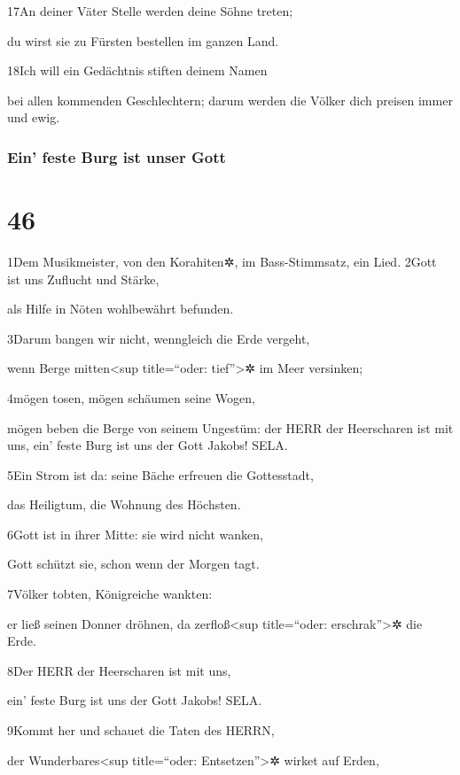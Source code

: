 17An deiner Väter Stelle werden deine Söhne treten;

du wirst sie zu Fürsten bestellen im ganzen Land.

18Ich will ein Gedächtnis stiften deinem Namen

bei allen kommenden Geschlechtern; darum werden die Völker dich preisen
immer und ewig.

\hypertarget{ein-feste-burg-ist-unser-gott}{%
\subsubsection{Ein' feste Burg ist unser
Gott}\label{ein-feste-burg-ist-unser-gott}}

\hypertarget{section-45}{%
\section{46}\label{section-45}}

1Dem Musikmeister, von den Korahiten✲, im Bass-Stimmsatz, ein Lied.
2Gott ist uns Zuflucht und Stärke,

als Hilfe in Nöten wohlbewährt befunden.

3Darum bangen wir nicht, wenngleich die Erde vergeht,

wenn Berge mitten\textless sup title=``oder: tief''\textgreater✲ im Meer
versinken;

4mögen tosen, mögen schäumen seine Wogen,

mögen beben die Berge von seinem Ungestüm: der HERR der Heerscharen ist
mit uns, ein' feste Burg ist uns der Gott Jakobs! SELA.

5Ein Strom ist da: seine Bäche erfreuen die Gottesstadt,

das Heiligtum, die Wohnung des Höchsten.

6Gott ist in ihrer Mitte: sie wird nicht wanken,

Gott schützt sie, schon wenn der Morgen tagt.

7Völker tobten, Königreiche wankten:

er ließ seinen Donner dröhnen, da zerfloß\textless sup title=``oder:
erschrak''\textgreater✲ die Erde.

8Der HERR der Heerscharen ist mit uns,

ein' feste Burg ist uns der Gott Jakobs! SELA.

9Kommt her und schauet die Taten des HERRN,

der Wunderbares\textless sup title=``oder: Entsetzen''\textgreater✲
wirket auf Erden,

